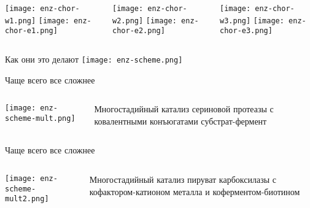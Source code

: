 \begin{frame}[plain]
\begin{columns}
\begin{column}{0.3\textwidth}
            \texttt{[image: enz-chor-w1.png]}
            \texttt{[image: enz-chor-e1.png]}
\end{column}
\begin{column}{0.3\textwidth}
            \texttt{[image: enz-chor-w2.png]}
            \texttt{[image: enz-chor-e2.png]}
\end{column}
\begin{column}{0.3\textwidth}
            \texttt{[image: enz-chor-w3.png]}
            \texttt{[image: enz-chor-e3.png]}
\end{column}
\end{columns}
\end{frame}


\begin{frame}{Как они это делают}
            \texttt{[image: enz-scheme.png]}
\end{frame}

\begin{frame}{Чаще всего все сложнее}
\begin{columns}
\begin{column}{0.7\textwidth}
    \texttt{[image: enz-scheme-mult.png]}
\end{column}
\begin{column}{0.3\textwidth}
    Многостадийный катализ сериновой протеазы с ковалентными конъюгатами субстрат-фермент
\end{column}
\end{columns}
\end{frame}


\begin{frame}{Чаще всего все сложнее}
\begin{columns}
\begin{column}{0.7\textwidth}
    \texttt{[image: enz-scheme-mult2.png]}
\end{column}
\begin{column}{0.3\textwidth}
    Многостадийный катализ пируват карбоксилазы с кофактором-катионом металла и коферментом-биотином
\end{column}
\end{columns}
\end{frame}



